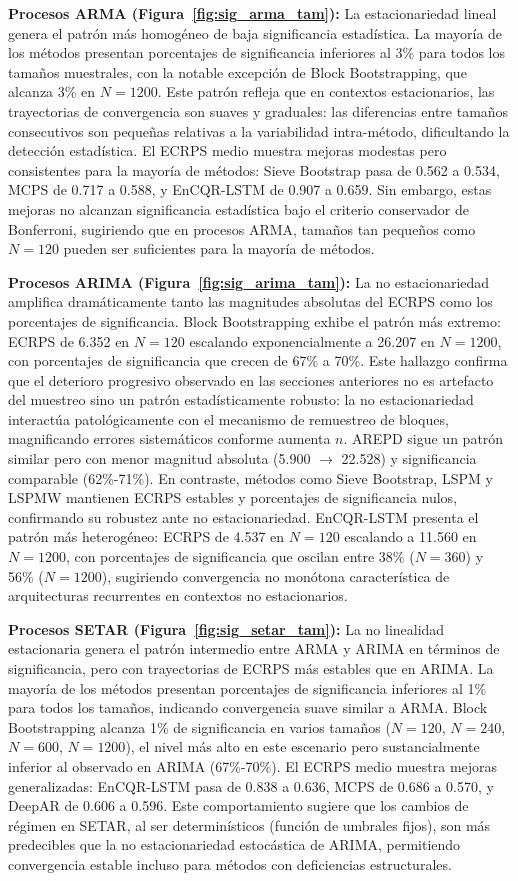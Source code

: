 \textbf{Procesos ARMA (Figura~\ref{fig:sig_arma_tam}):} La estacionariedad lineal genera el patrón más homogéneo de baja significancia estadística. La mayoría de los métodos presentan porcentajes de significancia inferiores al 3\% para todos los tamaños muestrales, con la notable excepción de Block Bootstrapping, que alcanza 3\% en $N=1200$. Este patrón refleja que en contextos estacionarios, las trayectorias de convergencia son suaves y graduales: las diferencias entre tamaños consecutivos son pequeñas relativas a la variabilidad intra-método, dificultando la detección estadística. El ECRPS medio muestra mejoras modestas pero consistentes para la mayoría de métodos: Sieve Bootstrap pasa de 0.562 a 0.534, MCPS de 0.717 a 0.588, y EnCQR-LSTM de 0.907 a 0.659. Sin embargo, estas mejoras no alcanzan significancia estadística bajo el criterio conservador de Bonferroni, sugiriendo que en procesos ARMA, tamaños tan pequeños como $N = 120$ pueden ser suficientes para la mayoría de métodos.

\textbf{Procesos ARIMA (Figura~\ref{fig:sig_arima_tam}):} La no estacionariedad amplifica dramáticamente tanto las magnitudes absolutas del ECRPS como los porcentajes de significancia. Block Bootstrapping exhibe el patrón más extremo: ECRPS de 6.352 en $N=120$ escalando exponencialmente a 26.207 en $N=1200$, con porcentajes de significancia que crecen de 67\% a 70\%. Este hallazgo confirma que el deterioro progresivo observado en las secciones anteriores no es artefacto del muestreo sino un patrón estadísticamente robusto: la no estacionariedad interactúa patológicamente con el mecanismo de remuestreo de bloques, magnificando errores sistemáticos conforme aumenta $n$. AREPD sigue un patrón similar pero con menor magnitud absoluta (5.900 $\to$ 22.528) y significancia comparable (62\%-71\%). En contraste, métodos como Sieve Bootstrap, LSPM y LSPMW mantienen ECRPS estables y porcentajes de significancia nulos, confirmando su robustez ante no estacionariedad. EnCQR-LSTM presenta el patrón más heterogéneo: ECRPS de 4.537 en $N=120$ escalando a 11.560 en $N=1200$, con porcentajes de significancia que oscilan entre 38\% ($N=360$) y 56\% ($N=1200$), sugiriendo convergencia no monótona característica de arquitecturas recurrentes en contextos no estacionarios.

\textbf{Procesos SETAR (Figura~\ref{fig:sig_setar_tam}):} La no linealidad estacionaria genera el patrón intermedio entre ARMA y ARIMA en términos de significancia, pero con trayectorias de ECRPS más estables que en ARIMA. La mayoría de los métodos presentan porcentajes de significancia inferiores al 1\% para todos los tamaños, indicando convergencia suave similar a ARMA. Block Bootstrapping alcanza 1\% de significancia en varios tamaños ($N=120$, $N=240$, $N=600$, $N=1200$), el nivel más alto en este escenario pero sustancialmente inferior al observado en ARIMA (67\%-70\%). El ECRPS medio muestra mejoras generalizadas: EnCQR-LSTM pasa de 0.838 a 0.636, MCPS de 0.686 a 0.570, y DeepAR de 0.606 a 0.596. Este comportamiento sugiere que los cambios de régimen en SETAR, al ser determinísticos (función de umbrales fijos), son más predecibles que la no estacionariedad estocástica de ARIMA, permitiendo convergencia estable incluso para métodos con deficiencias estructurales.

